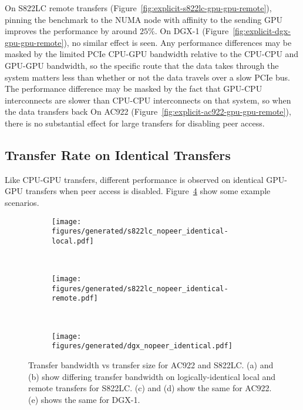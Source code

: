 On S822LC remote transfers (Figure~\ref{fig:explicit-s822lc-gpu-gpu-remote}), pinning the benchmark to the NUMA node with affinity to the sending GPU improves the performance by around $25$\%.
On DGX-1 (Figure~\ref{fig:explicit-dgx-gpu-gpu-remote}), no similar effect is seen.
Any performance differences may be masked by the limited PCIe CPU-GPU bandwidth relative to the CPU-CPU and GPU-GPU bandwidth, so the specific route that the data takes through the system matters less than whether or not the data travels over a slow PCIe bus.
The performance difference may be masked by the fact that GPU-CPU interconnects are slower than CPU-CPU interconnects on that system, so when the data transfers back
On AC922 (Figure~\ref{fig:explicit-ac922-gpu-gpu-remote}), there is no substantial effect for large transfers for disabling peer access.

\subsection{Transfer Rate on Identical Transfers}
\label{sec:explicit-peer-identical}

Like CPU-GPU transfers, different performance is observed on identical GPU-GPU transfers when peer access is disabled.
Figure~\ref{fig:explicit-nopeer-identical} show some example scenarios.

\begin{figure}[ht]
	\centering
	\begin{subfigure}[b]{0.4\textwidth}
		\texttt{[image: figures/generated/s822lc\_nopeer\_identical-local.pdf]}
		\caption{}
		\label{fig:explicit-nopeer-identical-s822lc-local}
	\end{subfigure}
	~
	\begin{subfigure}[b]{0.4\textwidth}
		\texttt{[image: figures/generated/s822lc\_nopeer\_identical-remote.pdf]}
		\caption{}
		\label{fig:explicit-nopeer-identical-s822lc-remote}
	\end{subfigure}
	\\
	\begin{subfigure}[b]{0.4\textwidth}
		\texttt{[image: figures/generated/dgx\_nopeer\_identical.pdf]}
		\caption{}
		\label{fig:explicit-nopeer-identical-dgx}
	\end{subfigure}
	\caption[GPU-GPU \texttt{cudaMemcpy} Bandwidth on Identical Links]{
		Transfer bandwidth vs transfer size for AC922 and S822LC.
		(a) and (b) show differing transfer bandwidth on logically-identical local and remote transfers for S822LC.
		(c) and (d) show the same for AC922.
		(e) shows the same for DGX-1.
	}
	\label{fig:explicit-nopeer-identical}
\end{figure}

